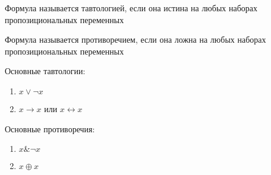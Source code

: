 \documentclass[main]{subfiles}
\begin{document}
\begin{definition}[Тавтология]
    Формула называется тавтологией, если она истина на любых наборах 
    пропозициональных переменных
\end{definition}
\begin{definition}[Противоречие]
    Формула называется противоречием, если она ложна на любых наборах 
    пропозициональных переменных
\end{definition}
Основные тавтологии:
\begin{enumerate}
    \item $x \lor \lnot x$
    \item $x\to x$ или $x\leftrightarrow x$
\end{enumerate}
Основные противоречия:
\begin{enumerate}
    \item $x\& \lnot x$
    \item $x\oplus x$
\end{enumerate}
\end{document}
